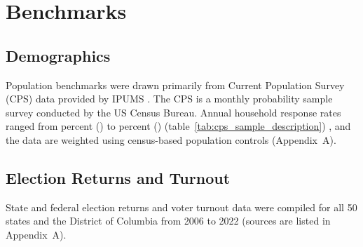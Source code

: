 \documentclass[12pt]{article}
\begin{document}
\section{Benchmarks}
\subsection{Demographics}
Population benchmarks were drawn primarily from Current Population Survey (CPS) data provided by IPUMS \parencite{flood_ipums_2024}. The CPS is a monthly probability sample survey conducted by the US Census Bureau. Annual household response rates ranged from \CpsRateMin{} percent (\CpsRateMinYear{}) to \CpsRateMax{} percent (\CpsRateMaxYear{}) (table~\ref{tab:cps_sample_description}) \parencite{bls_cps_response_rates}, and the data are weighted using census-based population controls (Appendix~A).




\subsection*{Election Returns and Turnout}

State and federal election returns and voter turnout data were compiled for all 50 states and the District of Columbia from 2006 to 2022 (sources are listed in Appendix~A).
\end{document}
